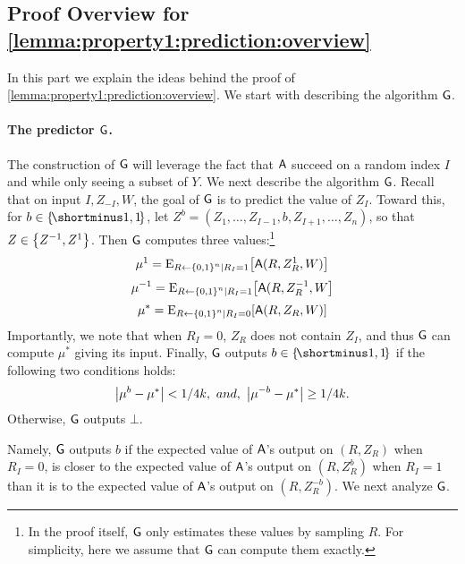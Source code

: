 \subsection{Proof Overview for  \cref{lemma:property1:prediction:overview}}\label{sec:overview:prediction-lemma}
In this part we explain the ideas behind the proof of \cref{lemma:property1:prediction:overview}. We start with describing the algorithm $\mathsf{G}$. 
\paragraph{The predictor  $\mathsf{G}$.} The construction of $\mathsf{G}$ will leverage the fact that $\mathsf{A}$ succeed on a random index $I$ and while only seeing a subset of $Y$. We next describe the algorithm $\mathsf{G}$. Recall that on input $I, Z_{-I},W$, the goal of $\mathsf{G}$ is to predict the value of $Z_I$. Toward this, for $b\in \oo$, let $Z^b=(Z_1,\dots,Z_{I-1},b,Z_{I+1},\dots,Z_n)$, so that $Z\in \set{Z^{-1},Z^{1}}$. Then $\mathsf{G}$ computes three values:\footnote{In the proof itself, $\mathsf{G}$ only estimates these values by sampling $R$. For simplicity, here we assume that $\mathsf{G}$ can compute them exactly.}
\[\mu^{1} = \eex{R\gets \zn\mid R_I=1}{\Ac(R,Z^1_R,W)}\]
\[\mu^{-1} = \eex{R\gets \zn\mid R_I=1}{\Ac(R,Z^{-1}_R,W}\]
\[\mu^{*} = \eex{R\gets \zn\mid R_I=0}{\Ac(R,Z_R,W)}\]
Importantly, we note that when $R_I=0$,  $Z_R$ does not contain $Z_I$, and thus $\mathsf{G}$ can compute $\mu^*$ giving its input.
Finally, $\mathsf{G}$ outputs $b\in \oo$ if the following two conditions holds:
\[ \size{\mu^b-\mu^*}< 1/4k,\ and,\ \size{\mu^{-b}-\mu^{*}}\ge 1/4k. \] 
Otherwise, $\mathsf{G}$ outputs $\bot$.

Namely, $\mathsf{G}$ outputs $b$ if the expected value of $\mathsf{A}$'s output on $(R, Z_R)$ when $R_I=0$, is closer to the expected value of $\mathsf{A}$'s output on $(R, Z^b_R)$ when $R_I=1$ than it is to the expected value of $\mathsf{A}$'s output on $(R, Z^{-b}_R)$. We next analyze $\mathsf{G}$. 

